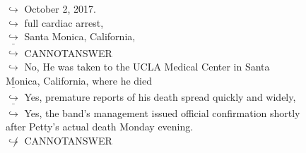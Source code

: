 \documentclass[11pt,a4paper, onecolumn]{article}
\begin{document}
\begin{figure}[t] \small \begin{tcolorbox}[boxsep=0pt,left=5pt,right=0pt,top=2pt,colback = yellow!5] \begin{dialogue}
 \small 
\colorbox{pink!25}{$\hookrightarrow$}
{ October 2, 2017. }
\\
\colorbox{pink!25}{$\hookrightarrow$}
{ full cardiac arrest, }
\\
\colorbox{pink!25}{$\hookrightarrow$}
{ Santa Monica, California, }
\\
\colorbox{pink!25}{ $\bar{\hookrightarrow}$}
{ CANNOTANSWER }
\\
\colorbox{pink!25}{$\hookrightarrow$}
\colorbox{red!25}{No,}
{ He was taken to the UCLA Medical Center in Santa Monica, California, where he died }
\\
\colorbox{pink!25}{ $\bar{\hookrightarrow}$}
\colorbox{red!25}{Yes,}
{ premature reports of his death spread quickly and widely, }
\\
\colorbox{pink!25}{ $\bar{\hookrightarrow}$}
\colorbox{red!25}{Yes,}
{ the band's management issued official confirmation shortly after Petty's actual death Monday evening. }
\\
\colorbox{pink!25}{$\not\hookrightarrow$}
{ CANNOTANSWER }
 \end{dialogue}\end{tcolorbox}\end{figure}
\end{document}
